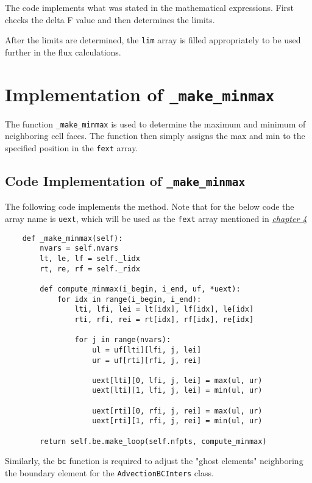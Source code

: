 \documentclass[a4paper, 12pt]{article}
\begin{document}
The code implements what was stated in the mathematical expressions. First checks the delta F value and then determines the limits. \\\par

After the limits are determined, the \verb|lim| array is filled appropriately to be used further in the flux calculations.

\section{Implementation of \texttt{\_make\_minmax}} \label{c4} 

The function \verb|_make_minmax| is used to determine the maximum and minimum of neighboring cell faces. The function then simply assigns the max and min to the specified position in the \verb|fext| array.

\subsection{Code Implementation of \texttt{\_make\_minmax}} 

The following code implements the method. Note that for the below code the array name is \verb|uext|, which will be used as the \verb|fext| array mentioned in \hyperref[c4]{\textit{chapter 4}}

\begin{verbatim}
    def _make_minmax(self):
        nvars = self.nvars
        lt, le, lf = self._lidx
        rt, re, rf = self._ridx

        def compute_minmax(i_begin, i_end, uf, *uext):
            for idx in range(i_begin, i_end):
                lti, lfi, lei = lt[idx], lf[idx], le[idx]
                rti, rfi, rei = rt[idx], rf[idx], re[idx]

                for j in range(nvars):
                    ul = uf[lti][lfi, j, lei]
                    ur = uf[rti][rfi, j, rei]

                    uext[lti][0, lfi, j, lei] = max(ul, ur)
                    uext[lti][1, lfi, j, lei] = min(ul, ur)

                    uext[rti][0, rfi, j, rei] = max(ul, ur)
                    uext[rti][1, rfi, j, rei] = min(ul, ur)

        return self.be.make_loop(self.nfpts, compute_minmax)
\end{verbatim}
\par
Similarly, the \verb|bc| function is required to adjust the "ghost elements" neighboring the boundary element for the \verb|AdvectionBCInters| class. \\\par
\end{document}
